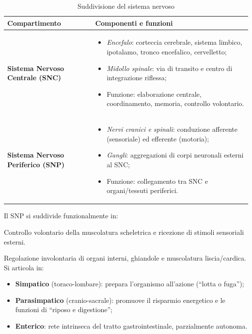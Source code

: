 \documentclass[11pt,a4paper,italian,twoside]{report}
\theoremstyle{definition} %
\begin{document}
\begin{table}[htbp]
  \centering
  \caption{Suddivisione del sistema nervoso}
  \label{tab:divisione_sn}
  \begin{tabularx}{\textwidth}{l X}
    \toprule
    \textbf{Compartimento} & \textbf{Componenti e funzioni} \\
    \midrule
    \textbf{Sistema Nervoso Centrale (SNC)} & 
    \begin{itemize}[leftmargin=1.2em,noitemsep,topsep=0pt,partopsep=0pt]
      \item \textit{Encefalo}: corteccia cerebrale, sistema limbico, ipotalamo, tronco encefalico, cervelletto;
      \item \textit{Midollo spinale}: via di transito e centro di integrazione riflessa;
      \item Funzione: elaborazione centrale, coordinamento, memoria, controllo volontario.
    \end{itemize} \\
    \addlinespace
    \textbf{Sistema Nervoso Periferico (SNP)} & 
    \begin{itemize}[leftmargin=1.2em,noitemsep,topsep=0pt,partopsep=0pt]
      \item \textit{Nervi cranici e spinali}: conduzione afferente (sensoriale) ed efferente (motoria);
      \item \textit{Gangli}: aggregazioni di corpi neuronali esterni al SNC;
      \item Funzione: collegamento tra SNC e organi/tessuti periferici.
    \end{itemize} \\
    \bottomrule
  \end{tabularx}
\end{table}

Il SNP si suddivide funzionalmente in:
\begin{description}[leftmargin=1.5em,style=nextline]
  \item[Sistema somatico] Controllo volontario della muscolatura scheletrica e ricezione di stimoli sensoriali esterni.
  \item[Sistema autonomo (viscerale)] Regolazione involontaria di organi interni, ghiandole e muscolatura liscia/cardica. Si articola in:
  \begin{itemize}[leftmargin=1.2em,noitemsep,topsep=0pt,partopsep=0pt]
    \item \textbf{Simpatico} (toraco-lombare): prepara l'organismo all'azione (``lotta o fuga'');
    \item \textbf{Parasimpatico} (cranio-sacrale): promuove il risparmio energetico e le funzioni di ``riposo e digestione'';
    \item \textbf{Enterico}: rete intrinseca del tratto gastrointestinale, parzialmente autonoma.
  \end{itemize}
\end{description}
\end{document}
